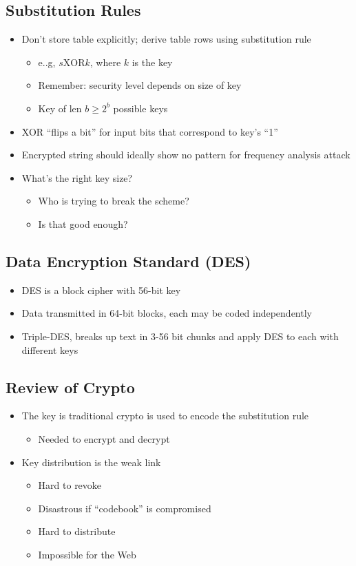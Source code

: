 \subsection{Substitution Rules}
\begin{itemize}
	\item Don't store table explicitly; derive table rows using substitution rule
	\begin{itemize}
		\item e..g, $s \text{XOR} k$, where $k$ is the key
		\item Remember: security level depends on size of key
		\item Key of len $b\geq 2^b$ possible keys
	\end{itemize}
	\item XOR ``flips a bit'' for input bits that correspond to key's ``1''
	\item Encrypted string should ideally show no pattern for frequency analysis attack
	\item What's the right key size?
	\begin{itemize}
		\item Who is trying to break the scheme?
		\item Is that good enough?
	\end{itemize}
\end{itemize}

\subsection{Data Encryption Standard (DES)}
\begin{itemize}
	\item DES is a block cipher with 56-bit key
	\item Data transmitted in 64-bit blocks, each may be coded independently
	\item Triple-DES, breaks up text in 3-56 bit chunks and apply DES to each with different keys
\end{itemize}

\subsection{Review of Crypto}
\begin{itemize}
	\item The key is traditional crypto is used to encode the substitution rule
	\begin{itemize}
		\item Needed to encrypt and decrypt
	\end{itemize}
	\item Key distribution is the weak link
	\begin{itemize}
		\item Hard to revoke
		\item Disastrous if ``codebook'' is compromised
		\item Hard to distribute 
		\item Impossible for the Web
	\end{itemize}
\end{itemize}

